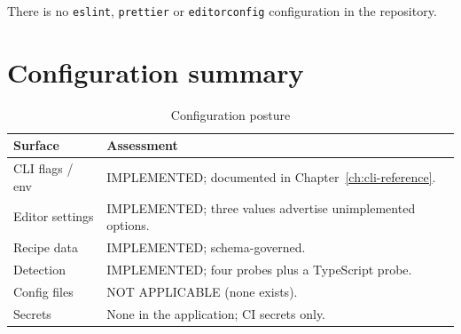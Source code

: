 There is no \texttt{eslint}, \texttt{prettier} or \texttt{editorconfig}
configuration in the repository.

\section{Configuration summary}

\begin{table}[H]
\centering
\caption{Configuration posture}
\begin{tabular}{@{}L{4.4cm}L{9.8cm}@{}}
\toprule
\textbf{Surface} & \textbf{Assessment} \\
\midrule
CLI flags / env & IMPLEMENTED; documented in Chapter~\ref{ch:cli-reference}. \\
Editor settings & IMPLEMENTED; three values advertise unimplemented options. \\
Recipe data & IMPLEMENTED; schema-governed. \\
Detection & IMPLEMENTED; four probes plus a TypeScript probe. \\
Config files & NOT APPLICABLE (none exists). \\
Secrets & None in the application; CI secrets only. \\
\bottomrule
\end{tabular}
\end{table}

